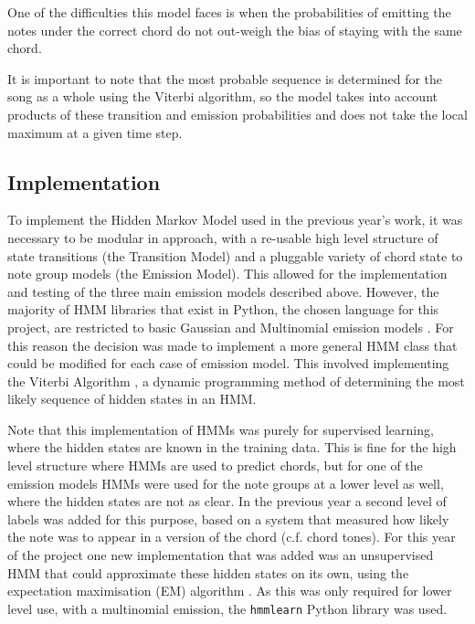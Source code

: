\documentclass[bsc,singlespacing,logo, parskip, deptreport]{infthesis}
\begin{document}
One of the difficulties this model faces is when the probabilities of emitting the notes under the correct chord do not out-weigh the bias of staying with the same chord.

It is important to note that the most probable sequence is determined for the song as a whole using the Viterbi algorithm, so the model takes into account products of these transition and emission probabilities and does not take the local maximum at a given time step.

\subsection{Implementation} \label{HMM IMP}

To implement the Hidden Markov Model used in the previous year's work, it was necessary to be modular in approach, with a re-usable high level structure of state transitions (the Transition Model) and a pluggable variety of chord state to note group models (the Emission Model). This allowed for the implementation and testing of the three main emission models described above. However, the majority of HMM libraries that exist in Python, the chosen language for this project, are restricted to basic Gaussian and Multinomial emission models \cite{lebedev_2015} \cite{buitinck}. For this reason the decision was made to implement a more general HMM class that could be modified for each case of emission model. This involved implementing the Viterbi Algorithm \cite{forney1973viterbi}, a dynamic programming method of determining the most likely sequence of hidden states in an HMM.

Note that this implementation of HMMs was purely for supervised learning, where the hidden states are known in the training data. This is fine for the high level structure where HMMs are used to predict chords, but for one of the emission models HMMs were used for the note groups at a lower level as well, where the hidden states are not as clear. In the previous year a second level of labels was added for this purpose, based on a system that measured how likely the note was to appear in a version of the chord (c.f. chord tones). For this year of the project one new implementation that was added was an unsupervised HMM that could approximate these hidden states on its own, using the expectation maximisation (EM) algorithm \cite{moon1996expectation}. As this was only required for lower level use, with a multinomial emission, the {\tt hmmlearn} \cite{lebedev_2015} Python library was used.
\end{document}
